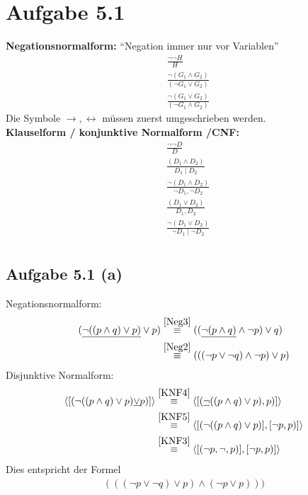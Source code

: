 \documentclass[12pt,a4paper]{article}
\author{Willi Sontopski}
\begin{document}

\section*{Aufgabe 5.1}
\textbf{Negationsnormalform:} ``Negation immer nur vor Variablen''\\
\begin{align}
&\frac{\neg\neg H}{H}\label{Neg1}\\
&\frac{\neg(G_1\wedge G_2)}{(\neg G_1\vee G_2)}\label{Neg2}\\
&\frac{\neg(G_1\vee G_2)}{(\neg G_1\wedge G_2)}\label{Neg3}
\end{align}
Die Symbole $\to, \leftrightarrow$ müssen zuerst umgeschrieben werden.\\

\textbf{Klauselform / konjunktive Normalform /CNF:}\\
\begin{align}
&\frac{\neg\neg D}{D}\label{KNF1}\\
&\frac{(D_1\wedge D_2)}{D_1\mid D_2}\label{KNF2}\\
&\frac{\neg(D_1\wedge D_2)}{\neg D_1,\neg D_2}\label{KNF3}\\
&\frac{(D_1\vee D_2)}{D_1, D_2}\label{KNF4}\\
&\frac{\neg(D_1\vee D_2)}{\neg D_1\mid\neg D_2}\label{KNF5}\\
\end{align}

\subsection*{Aufgabe 5.1 (a)}
Negationsnormalform:
\begin{align*}
(\underline{\neg (( p\wedge q)\vee p)}\vee p)
&\stackrel{\ref{Neg3}}{\equiv}
((\underline{\neg(p\wedge q)}\wedge\neg p)\vee q)\\
&\stackrel{\ref{Neg2}}{\equiv}
(((\neg p\vee \neg q)\wedge\neg p)\vee p)
\end{align*}
Disjunktive Normalform:
\begin{align*}
\langle[(\neg (( p\wedge q)\vee p)\underline{\vee} p)]\rangle
&\stackrel{\ref{KNF4}}{\equiv}
\langle[(\underline{\neg} (( p\wedge q)\vee p), p)]\rangle\\
&\stackrel{\ref{KNF5}}{\equiv}
\langle[(\neg (( p\wedge q)\vee p)],[\neg p,p)]\rangle\\
&\stackrel{\ref{KNF3}}{\equiv}
\langle[(\neg p,\neg, p)],[\neg p,p)]\rangle\\
\end{align*}
Dies entspricht der Formel
\begin{align*}
(((\neg p\vee\neg q)\vee p)\wedge(\neg p\vee p)))
\end{align*}
\end{document}
